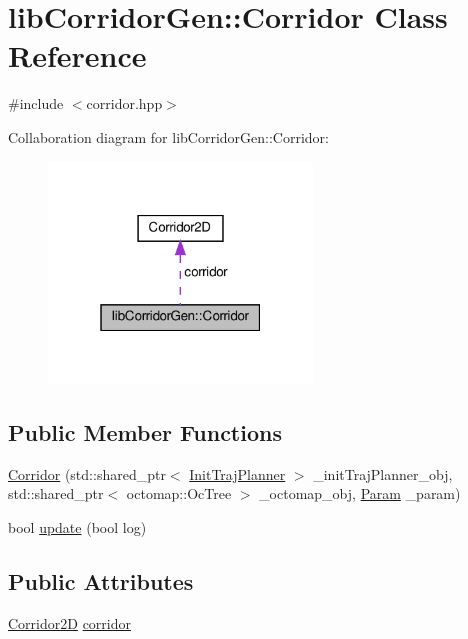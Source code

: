 \hypertarget{classlib_corridor_gen_1_1_corridor}{}\section{lib\+Corridor\+Gen\+:\+:Corridor Class Reference}
\label{classlib_corridor_gen_1_1_corridor}


{\ttfamily \#include $<$corridor.\+hpp$>$}



Collaboration diagram for lib\+Corridor\+Gen\+:\+:Corridor\+:
\nopagebreak
\begin{figure}[H]
\begin{center}
\leavevmode
\includegraphics[width=199pt]{classlib_corridor_gen_1_1_corridor__coll__graph}
\end{center}
\end{figure}
\subsection*{Public Member Functions}
\begin{DoxyCompactItemize}
\item 
\hyperlink{classlib_corridor_gen_1_1_corridor_aeed77ae6b1e91f67df1d5f0d05de9f72}{Corridor} (std\+::shared\+\_\+ptr$<$ \hyperlink{classlib_corridor_gen_1_1_init_traj_planner}{Init\+Traj\+Planner} $>$ \+\_\+init\+Traj\+Planner\+\_\+obj, std\+::shared\+\_\+ptr$<$ octomap\+::\+Oc\+Tree $>$ \+\_\+octomap\+\_\+obj, \hyperlink{classlib_corridor_gen_1_1_param}{Param} \+\_\+param)
\item 
bool \hyperlink{classlib_corridor_gen_1_1_corridor_ac909b465688a8a5e50c6740f20c1b8bd}{update} (bool log)
\end{DoxyCompactItemize}
\subsection*{Public Attributes}
\begin{DoxyCompactItemize}
\item 
\hyperlink{struct_corridor2_d}{Corridor2D} \hyperlink{classlib_corridor_gen_1_1_corridor_af32ca65c896d5c952655106b74ea4666}{corridor}
\end{DoxyCompactItemize}


